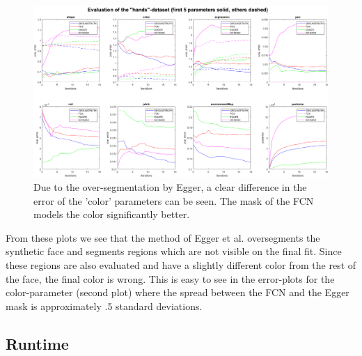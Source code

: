 \begin{figure}
	\centering
	\includegraphics[angle=90,width=.55\textheight]{Figures/chap3/plot_hands_setting2.png}
	\caption{Due to the over-segmentation by Egger, a clear difference in the error of the 'color' parameters can be seen. The mask of the FCN models the color significantly better.}
	\label{fig:chap3:plot_hands_setup2}
\end{figure}

\FloatBarrier

From these plots we see that the method of Egger et al. oversegments the synthetic face and segments regions which are not visible on the final fit. Since these regions are also evaluated and have a slightly different color from the rest of the face, the final color is wrong. This is easy to see in the error-plots for the color-parameter (second plot) where the spread between the FCN and the Egger mask is approximately .5 standard deviations.

\subsection{Runtime}

